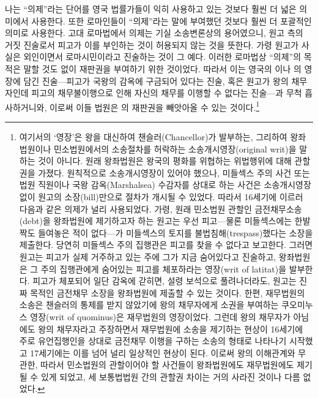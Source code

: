 나는 ``의제''라는 단어를 영국 법률가들이 익히 사용하고 있는 것보다
훨씬 더 넓은 의미에서 사용한다. 또한 로마인들이 ``의제''라는
말에 부여했던 것보다 훨씬 더 포괄적인 의미로 사용한다.
고대 로마법에서 의제는 기실 소송변론상의 용어였으니,
원고 측의 거짓 진술로서 피고가 이를 부인하는 것이 허용되지 않는 것을 뜻한다.
가령 원고가 사실은 외인이면서 로마시민이라고 진술하는 것이 그 예다.
이러한 로마법상 ``의제''의 목적은 말할 것도 없이 재판권을 부여하기 위한
것이었다.
\label{commonlawfiction}%
따라서 이는 영국의 이나
의 영장에 담긴
진술---피고가 국왕의 감옥에 구금되어 있다는 진술, 혹은
원고가 왕의 채무자인데 피고의 채무불이행으로 인해
자신의 채무를 이행할 수 없다는
진술---과 무척 흡사하거니와,
이로써 이들 법원은 의 재판권을 빼앗아올 수 있는
것이다.\footnote{%
  여기서의 `영장'은 왕을 대신하여 챈슬러(Chancellor)가 발부하는,
  그리하여 왕좌법원이나 민소법원에서의 소송절차를 허락하는
  소송개시영장(original writ)을 말하는 것이 아니다.
  원래 왕좌법원은 왕국의 평화를 위협하는 위법행위에 대해 관할권을 가졌다.
  원칙적으로 소송개시영장이 있어야 했으나, 미들섹스 주의 사건 또는
  법원 직원이나 국왕 감옥(Marshalsea) 수감자를 상대로 하는 사건은
  소송개시영장 없이 원고의 소장(bill)만으로 절차가 개시될 수 있었다.
  따라서 16세기에 이르러 다음과 같은 의제가 널리 사용되었다.
  가령, 원래 민소법원 관할인 금전채무소송(debt)을 왕좌법원에 제기하고자 하는
  원고는 우선 피고---물론 미들섹스에는 한발짝도 들여놓은 적이 없다---가
  미들섹스의 토지를 불법침해(trespass)했다는 소장을 제출한다.
  당연히 미들섹스 주의 집행관은 피고를 찾을 수 없다고 보고한다.
  그러면 원고는 피고가 실제 거주하고 있는 주에 그가 지금 숨어있다고 진술하고,
  왕좌법원은 그 주의 집행관에게 숨어있는 피고를 체포하라는
  영장(writ of latitat)을 발부한다.
  피고가 체포되어 일단 감옥에 갇히면, 설령 보석으로 풀려나더라도,
  원고는 진짜 목적인 금전채무 소장을 왕좌법원에 제출할 수 있는 것이다.
  한편, 재무법원의 소송은 챈슬러의 통제를 받지 않았기에
  왕의 채무자에게 소권을 부여하는 쿠오미누스 영장(writ of quominus)은
  재무법원의 영장이었다.
  그런데 왕의 채무자가 아님에도 왕의 채무자라고 주장하면서
  재무법원에 소송을 제기하는 현상이 16세기에 주로
  유언집행인을 상대로 금전채무 이행을 구하는 소송의 형태로
  나타나기 시작했고 17세기에는 이를 넘어 널리 일상적인 현상이 된다.
  이로써 왕의 이해관계와 무관한, 따라서 민소법원의 관할이어야 할 사건들이
  왕좌법원에도 재무법원에도 제기될 수 있게 되었고, 세 보통법법원 간의
  관할권 차이는 거의 사라진 것이나 다름 없었다.
}
